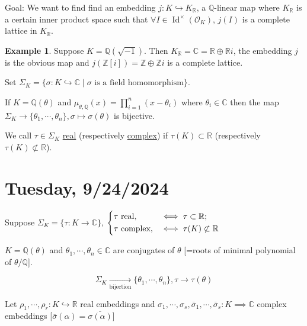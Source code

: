 \documentclass[openany]{amsbook}
\numberwithin{section}{chapter}
\theoremstyle{definition}
\newtheorem*{example}{Example}
\begin{document}
Goal: We want to find find an embedding \(j : K \hookrightarrow K_{\mathbb{R}}\), a \(\mathbb{Q}\)-linear map where \(K_\mathbb{R}\) is a certain inner product space such that \(\forall I \in \operatorname{Id}^\times (\mathcal{O}_K)\), \(j(I)\) is a complete lattice in \(K_{\mathbb{R}}\). 

\begin{example}
    Suppose \(K = \mathbb{Q}(\sqrt{-1})\). Then \(K_{\mathbb{R}} = \mathbb{C} = \mathbb{R} \oplus \mathbb{R} i\), the embedding \(j\) is the obvious map and \(j(\mathbb{Z}[i]) = \mathbb{Z} \oplus \mathbb{Z} i\) is a complete lattice.
\end{example}

Set \(\Sigma_K = \{ \sigma : K \hookrightarrow \mathbb{C} \mid \sigma  \text{ is a field homomorphism}  \} \).

If \(K = \mathbb{Q} (\theta)\) and \(\mu_{\theta ,\mathbb{Q}}(x) = \prod_{i=1}^n (x - \theta_i)\) where \(\theta_i \in \mathbb{C}\)  then the map \(\Sigma_K \to \{ \theta_1, \cdots , \theta_n \}, \sigma \mapsto \sigma(\theta)\) is bijective.

We call \(\tau \in \Sigma_K\) \underline{real} (respectively \underline{complex}) if \(\tau(K) \subset \mathbb{R}\) (respectively \(\tau(K) \not\subset \mathbb{R}\)).

\section*{Tuesday, 9/24/2024}

Suppose \(\Sigma _K = \{ \tau : K \to \mathbb{C} \} \), \(\begin{dcases}
    \tau \text{ real}, & \iff  \tau \subset \mathbb{R} ;\\
     \tau \text{ complex} , & \iff  \tau(K)\not\subset \mathbb{R}
\end{dcases}\) 

\(K = \mathbb{Q} (\theta)\) and \(\theta_1, \cdots , \theta_n\in\mathbb{C}\) are conjugates of \(\theta\) [=roots of minimal polynomial of \(\theta / \mathbb{Q}\)].

\[
    \Sigma _K \underset{\text{bijection}}{\to} \{ \theta_1, \cdots , \theta_n \}, \tau \to \tau (\theta)
\]

Let \(\rho_1, \cdots , \rho_r : K \hookrightarrow \mathbb{R}\) real embeddings and \(\sigma_1, \cdots , \sigma_s, \overline{\sigma}_1, \cdots , \overline{\sigma}_s : K \implies \mathbb{C}\) complex embeddings [\(\overline{\sigma}(\alpha) = \overline{\sigma(\alpha)}\)]
\end{document}
